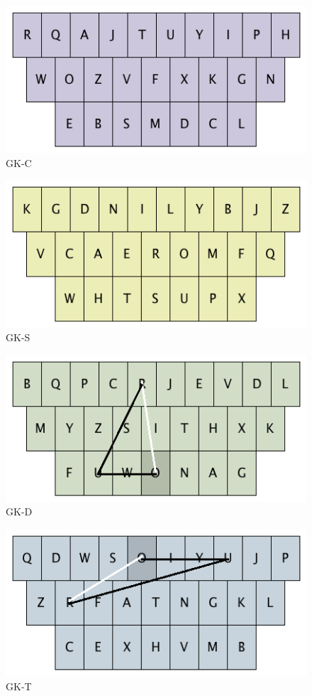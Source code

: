 \documentclass[12pt]{article}
\begin{document}
\begin{figure}[h!]
	\centering
	\includegraphics[scale=0.65]{Images/gkc}
	\caption{GK-C}
\end{figure}
\begin{figure}[h!]
	\centering
	\includegraphics[scale=0.65]{Images/gks}
	\caption{GK-S}
\end{figure}
\begin{figure}[h!]
	\centering
	\includegraphics[scale=0.65]{Images/gkd}
	\caption{GK-D}
\end{figure}
\begin{figure}[h!]
	\centering
	\includegraphics[scale=0.65]{Images/gkt}
	\caption{GK-T}
\end{figure}
\end{document}
